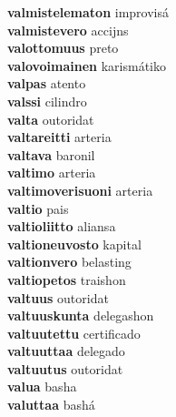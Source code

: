 \textbf{valmistelematon } improvisá \\
\textbf{valmistevero } accijns \\
\textbf{valottomuus } preto \\
\textbf{valovoimainen } karismátiko \\
\textbf{valpas } atento \\
\textbf{valssi } cilindro \\
\textbf{valta } outoridat \\
\textbf{valtareitti } arteria \\
\textbf{valtava } baronil \\
\textbf{valtimo } arteria \\
\textbf{valtimoverisuoni } arteria \\
\textbf{valtio } pais \\
\textbf{valtioliitto } aliansa \\
\textbf{valtioneuvosto } kapital \\
\textbf{valtionvero } belasting \\
\textbf{valtiopetos } traishon \\
\textbf{valtuus } outoridat \\
\textbf{valtuuskunta } delegashon \\
\textbf{valtuutettu } certificado \\
\textbf{valtuuttaa } delegado \\
\textbf{valtuutus } outoridat \\
\textbf{valua } basha \\
\textbf{valuttaa } bashá \\
